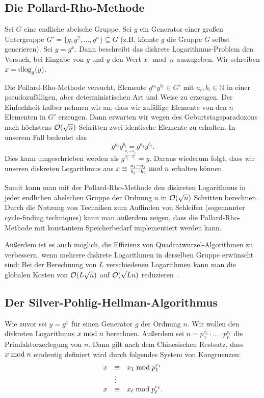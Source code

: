 \begin{refsegment}
\subsection{Die Pollard-Rho-Methode}
Sei $G$ eine endliche abelsche Gruppe. Sei $g$ ein Generator einer großen Untergruppe $G' = \{g, g^2, \ldots, g^n\} \subseteq G$ (z.B. könnte $g$ die Gruppe $G$ selbst generieren). Sei $y=g^{x}$. Dann beschreibt das diskrete Logarithmus-Problem den Versuch, bei Eingabe von $g$ und $y$ den Wert $x \mod n$ auszugeben.
Wir schreiben $x=\textrm{dlog}_g(y)$.

Die Pollard-Rho-Methode versucht, Elemente $g^{a_i}y^{b_i} \in G'$ mit $a_i, b_i \in \mathbb{N}$ in einer pseudozufälligen, aber deterministischen Art und Weise zu erzeugen. Der Einfachheit halber nehmen wir an, dass wir zufällige Elemente von den $n$ Elementen in $G'$ erzeugen. Dann erwarten wir wegen des Geburtstagsparadoxons nach höchstens ${\cal O}(\sqrt n)$ Schritten zwei identische Elemente zu erhalten. In unserem Fall bedeutet das
$$
  g^{a_i}y^{b_i} = g^{a_j}y^{b_j}.
$$
Dies kann umgeschrieben werden als $g^{\frac{a_i-a_j}{b_j-b_i}} = y$. Daraus wiederum folgt, dass wir unseren diskreten Logarithmus aus $x \equiv \frac{a_i-a_j}{b_j-b_i} \hspace{1mm}{\rm mod}\hspace{1mm} n$ erhalten können.

Somit kann man mit der Pollard-Rho-Methode den diskreten Logarithmus in jeder endlichen abelschen Gruppe der Ordnung $n$ in ${\cal O}(\sqrt n)$ Schritten berechnen. Durch die Nutzung von Techniken zum Auffinden von Schleifen (sogenannter cycle-finding techniques) kann man außerdem zeigen, dass die Pollard-Rho-Methode mit konstantem Speicherbedarf implementiert werden kann.

Außerdem ist es auch möglich, die Effizienz von Quadratwurzel-Algorithmen zu verbessern, wenn mehrere diskrete Logarithmen in derselben Gruppe erwünscht sind: Bei der Berechnung von $L$ verschiedenen Logarithmen kann man die globalen Kosten von ${\cal O} (L\sqrt{n})$ auf ${\cal O} (\sqrt{Ln})$ reduzieren~\cite{multiple2014}.


\subsection{Der Silver-Pohlig-Hellman-Algorithmus}
Wie zuvor sei $y = g^{x}$ für einen Generator $g$ der Ordnung $n$. Wir wollen den diskreten Logarithmus $x \hspace{1mm}{\rm mod}\hspace{1mm} n$ berechnen. Außerdem sei $n=p_1^{e_1} \cdot \ldots \cdot p_{\ell}^{e_{\ell}}$ die Primfaktorzerlegung von $n$. Dann gilt nach dem Chinesischen Restsatz, dass $x \hspace{1mm}{\rm mod}\hspace{1mm} n$ eindeutig definiert wird durch folgendes System von Kongruenzen:
\begin{equation}
\label{crt}
\begin{array}{lll}
  x & \equiv & x_1 \hspace{1mm}{\rm mod}\hspace{1mm} p_1^{e_1}\\
    & \vdots\\
  x & \equiv & x_{\ell} \hspace{1mm}{\rm mod}\hspace{1mm} p_{\ell}^{e_{\ell}}.	
\end{array}
\end{equation}


\end{refsegment}
